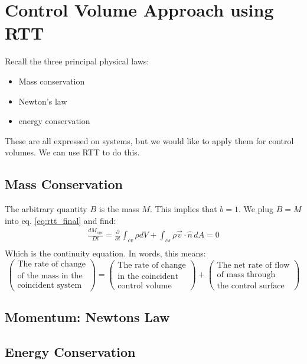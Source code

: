 \chapter{Control Volume Approach using RTT}

Recall the three principal physical laws:
\begin{itemize}
	\setlength{\itemsep}{-5pt}
	\item Mass conservation
	\item Newton's  law
	\item energy conservation
\end{itemize}
These are all expressed on systems, but we would like to apply them for control volumes. We can use RTT to do this.

\section{Mass Conservation}
The arbitrary quantity $B$ is the mass $M$. This implies that $b=1$. We plug $B=M$ into eq. \eqref{eq:rtt_final} and find:
\begin{equation}
	\begin{split}
		\frac{dM_{sys}}{Dt} = \boxed{\frac{\partial}{\partial t}  \int_{cv} \rho dV + \int _{cs} \rho \vec v \cdot \hat n \,dA =0}\\
	\end{split}
	\label{eq:continuity}
\end{equation}
Which is the continuity equation. In words, this means:
\begin{equation*}
	\left(\substack{
		\text{The rate of change}\\
		\text{of the mass in the}\\
		\text{coincident system}
		}\right) = \left(\substack{
		\text{The rate of change}\\
		\text{in the coincident}\\
		\text{control volume}
		}\right) + \left(\substack{
		\text{The net rate of flow}\\
		\text{of mass through}\\
		\text{the control surface}
		}\right)
\end{equation*}

\section{Momentum: Newtons  Law}

\section{Energy Conservation}